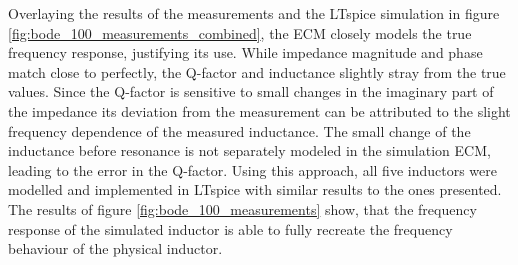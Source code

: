 Overlaying the results of the measurements and the LTspice simulation in figure \ref{fig:bode_100_measurements_combined}, the \ac{ECM} closely models the true frequency response, justifying its use. While impedance magnitude and phase match close to perfectly, the \ac{Q-factor} and inductance slightly stray from the true values. Since the \ac{Q-factor} is sensitive to small changes in the imaginary part of the impedance its deviation from the measurement can be attributed to the slight frequency dependence of the measured inductance. The small change of the inductance before resonance is not separately modeled in the simulation \ac{ECM}, leading to the error in the \ac{Q-factor}.
Using this approach, all five inductors were modelled and implemented in LTspice with similar results to the ones presented. The results of figure \ref{fig:bode_100_measurements} show, that the frequency response of the simulated inductor is able to fully recreate the frequency behaviour of the physical inductor.
